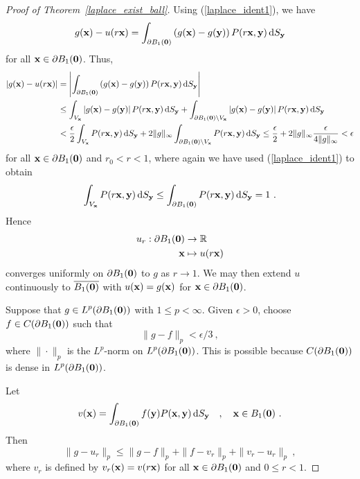 \begin{proof}[Proof of Theorem~\ref{laplace_exist_ball}]
Using (\ref{laplace_ident1}), we have
\[
g(\mathbf{x}) - u(r\mathbf{x})
=\int_{\partial B_1(\mathbf{0})} \left( g(\mathbf{x}) -g(\mathbf{y})\right)
P(r\mathbf{x},\mathbf{y}) \,\mathrm{d}{S}_{\mathbf{y}}
\]
for all $\mathbf{x} \in \partial B_1(\mathbf{0})$.  Thus,
\begin{align*}
\left| g(\mathbf{x}) - u(r\mathbf{x})\right|
&= \left| \int_{\partial B_1(\mathbf{0})} \left( g(\mathbf{x}) -g(\mathbf{y})\right)
P(r\mathbf{x},\mathbf{y}) \,\mathrm{d}{S}_{\mathbf{y}} \right| \\
&\leq \int_{V_{\mathbf{x}}} \left| g(\mathbf{x}) -g(\mathbf{y})\right|
P(r\mathbf{x},\mathbf{y}) \,\mathrm{d}{S}_{\mathbf{y}}
+\int_{\partial B_1(\mathbf{0})\setminus V_{\mathbf{x}}}
\left| g(\mathbf{x}) -g(\mathbf{y})\right| P(r\mathbf{x},\mathbf{y}) \,\mathrm{d}{S}_{\mathbf{y}} \\
&< \frac{\epsilon}{2} \int_{V_{\mathbf{x}}} P(r\mathbf{x},\mathbf{y})
\,\mathrm{d}{S}_{\mathbf{y}} + 2 \|g\|_{\infty}
\int_{\partial B_1(\mathbf{0})\setminus V_{\mathbf{x}}} P(r\mathbf{x},\mathbf{y}) \,\mathrm{d}{S}_{\mathbf{y}}
\leq \frac{\epsilon}{2} + 2 \|g\|_{\infty}
\frac{\epsilon}{4\|g\|_{\infty}} < \epsilon
\end{align*}
for all $\mathbf{x} \in \partial B_1(\mathbf{0})$ and $r_0<r<1$, where again
we have used (\ref{laplace_ident1}) to obtain
\[
\int_{V_{\VEC{x}}} P(r\VEC{x},\VEC{y}) \dss{S}{y}
\leq \int_{\partial B_1(\VEC{0})} P(r\VEC{x},\VEC{y}) \dss{S}{y} = 1 \ .
\]
Hence
\begin{align*}
u_r: \partial B_1(\mathbf{0}) &\rightarrow \mathbb{R} \\
\mathbf{x} &\mapsto u(r\mathbf{x})
\end{align*}
converges uniformly on $\partial B_1(\mathbf{0})$ to $g$ as
$r\rightarrow 1$.  We may then extend $u$ continuously to
$\overline{B_1(\mathbf{0})}$ with
$u(\mathbf{x})=g(\mathbf{x})$ for $\mathbf{x}\in \partial B_1(\mathbf{0})$.

  Suppose that $\displaystyle g\in L^p(\partial B_1(\mathbf{0}))$ with
$1\leq p < \infty$.  Given $\epsilon>0$, choose
$f\in C(\partial B_1(\mathbf{0}))$ such that
\begin{equation} \label{laplace_ident2}
\|g-f\|_p < \epsilon/3 \ , 
\end{equation}
where $\|\cdot\|_p$ is the $\displaystyle L^p$-norm on
$\displaystyle L^p(\partial B_1(\mathbf{0}))$.
This is possible because $C(\partial B_1(\mathbf{0}))$ is dense in
$\displaystyle L^p(\partial B_1(\mathbf{0}))$.

Let
\[
v(\mathbf{x}) = \int_{\partial B_1(\mathbf{0})} f(\mathbf{y})
P(\mathbf{x},\mathbf{y}) \,\mathrm{d}{S}_{\mathbf{y}}
\quad , \quad \mathbf{x} \in B_1(\mathbf{0}) \ .
\]
Then
\begin{equation} \label{laplace_ident5}
\|g-u_r\|_p \leq \| g - f \|_p + \| f - v_r \|_p + \| v_r - u_r\|_p \ ,
\end{equation}
where $v_r$ is defined by $v_r(\mathbf{x}) = v(r\mathbf{x})$ for all
$\mathbf{x} \in \partial B_1(\mathbf{0})$ and $0 \leq r < 1$.


\end{proof}

